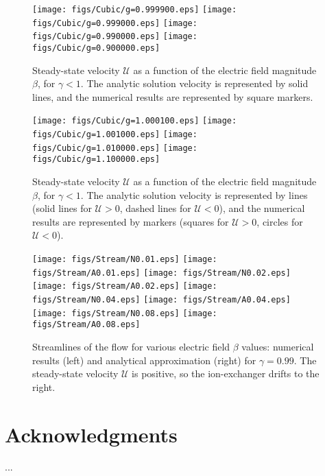 \documentclass[10pt]{ijnam}
\newcommand\cU{\mathscr{U}}
\begin{document}
\begin{figure}[htbp]
\end{figure}

\begin{figure}[htbp]
    \begin{center}
    \texttt{[image: figs/Cubic/g=0.999900.eps]}
    \texttt{[image: figs/Cubic/g=0.999000.eps]}
    \texttt{[image: figs/Cubic/g=0.990000.eps]}
    \texttt{[image: figs/Cubic/g=0.900000.eps]}
        \caption{Steady-state velocity $\cU$ as a function of the 
        electric field magnitude $\beta$, for $\gamma < 1$. 
        The analytic solution velocity is represented by solid lines, 
        and the numerical results are represented by square markers.}
	    \label{fig:Cubic1}
    \end{center}
\end{figure}
\begin{figure}[htbp]
    \begin{center}
    \texttt{[image: figs/Cubic/g=1.000100.eps]}
    \texttt{[image: figs/Cubic/g=1.001000.eps]}
    \texttt{[image: figs/Cubic/g=1.010000.eps]}
    \texttt{[image: figs/Cubic/g=1.100000.eps]}
        \caption{Steady-state velocity $\cU$ as a function of the 
        electric field magnitude $\beta$, for $\gamma < 1$. 
        The analytic solution velocity is represented by lines 
        (solid lines for $\cU > 0$, dashed lines for $\cU < 0$), 
        and the numerical results are represented by markers 
        (squares for $\cU > 0$, circles for $\cU < 0$).}
	    \label{fig:Cubic2}
    \end{center}
\end{figure}
\begin{figure}[htbp]
    \begin{center}
	\texttt{[image: figs/Stream/N0.01.eps]}
	\texttt{[image: figs/Stream/A0.01.eps]}
	\texttt{[image: figs/Stream/N0.02.eps]}
	\texttt{[image: figs/Stream/A0.02.eps]}
	\texttt{[image: figs/Stream/N0.04.eps]}
	\texttt{[image: figs/Stream/A0.04.eps]}
	\texttt{[image: figs/Stream/N0.08.eps]}
	\texttt{[image: figs/Stream/A0.08.eps]}
        \caption{Streamlines of the flow for various electric field $\beta$ values: 
        numerical results (left) and analytical approximation (right) for 
        $\gamma = 0.99$.  The steady-state velocity $\cU$ is positive, so the
        ion-exchanger drifts to the right. 
        }
    \label{fig:Vortex}
    \end{center}
\end{figure}

\section*{Acknowledgments}
...



\end{document}
